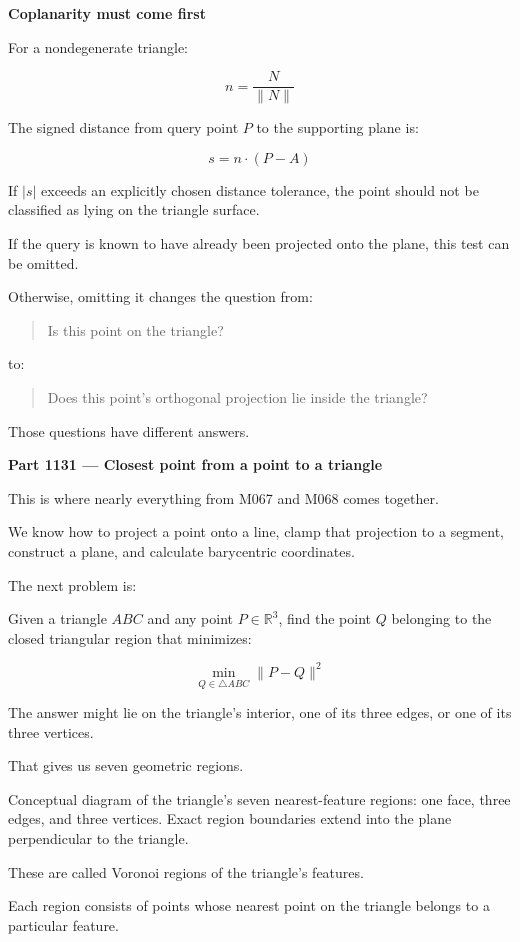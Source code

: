 \textbf{Coplanarity must come first}

For a nondegenerate triangle:

\[
n=\frac{N}{\|N\|}
\]

The signed distance from query point \(P\) to the supporting plane is:

\[
s=n\cdot(P-A)
\]

If \(|s|\) exceeds an explicitly chosen distance tolerance, the point should not be classified as lying on the triangle surface.

If the query is known to have already been projected onto the plane, this test can be omitted.

Otherwise, omitting it changes the question from:

\begin{quote}
Is this point on the triangle?
\end{quote}

to:

\begin{quote}
Does this point's orthogonal projection lie inside the triangle?
\end{quote}

Those questions have different answers.

\textbf{Part 1131 --- Closest point from a point to a triangle}

This is where nearly everything from M067 and M068 comes together.

We know how to project a point onto a line, clamp that projection to a segment, construct a plane, and calculate barycentric coordinates.

The next problem is:

Given a triangle \(ABC\) and any point \(P\in\mathbb R^3\), find the point \(Q\) belonging to the closed triangular region that minimizes:

\[
\boxed{ \min_{Q\in\triangle ABC}\|P-Q\|^2 }
\]

The answer might lie on the triangle's interior, one of its three edges, or one of its three vertices.

That gives us seven geometric regions.

Conceptual diagram of the triangle's seven nearest-feature regions: one face, three edges, and three vertices. Exact region boundaries extend into the plane perpendicular to the triangle.

These are called Voronoi regions of the triangle's features.

Each region consists of points whose nearest point on the triangle belongs to a particular feature.

